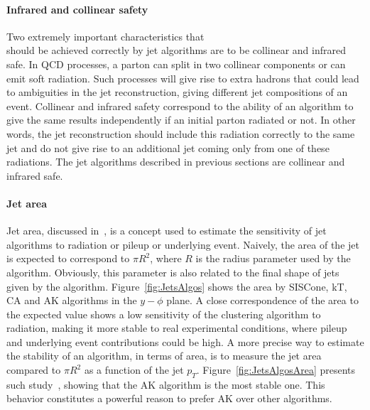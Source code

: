 \paragraph{Infrared and collinear safety}

\hfill Two extremely important characteristics that \\should be achieved correctly by jet algorithms are to be collinear and infrared safe. In QCD processes, a parton can split in two collinear components or can emit soft radiation. Such processes will give rise to extra hadrons that could lead to ambiguities in the jet reconstruction, giving different jet compositions of an event. Collinear and infrared safety correspond to the ability of an algorithm to give the same results independently if an initial parton radiated or not. In other words, the jet reconstruction should include this radiation correctly to the same jet and do not give rise to an additional jet coming only from one of these radiations.  The jet algorithms described in previous sections are collinear and infrared safe.

\paragraph{Jet area}

Jet area, discussed in~\cite{Cacciari:2008gn}, is a concept used to estimate the sensitivity of jet algorithms to radiation or pileup or underlying event. Naively, the area of the jet is expected to correspond to $\pi R^{2}$, where $R$ is the radius parameter used by the algorithm. Obviously, this parameter is also related to the final shape of jets given by the algorithm. Figure~\ref{fig:JetsAlgos} shows the area by SISCone, kT, CA and AK algorithms in the $y-\phi$ plane. A close correspondence of the area to the expected value shows a low sensitivity of the clustering algorithm to radiation, making it more stable to real experimental conditions, where pileup and underlying event contributions could be high. A more precise way to estimate the stability of an algorithm, in terms of area, is to measure the jet area compared to $\pi R^{2}$ as a function of the jet $p_{T}$. Figure~\ref{fig:JetsAlgosArea} presents such study~\cite{Cacciari:2008gp}, showing that the AK algorithm is the most stable one. This behavior constitutes a powerful reason to prefer AK over other algorithms. 

